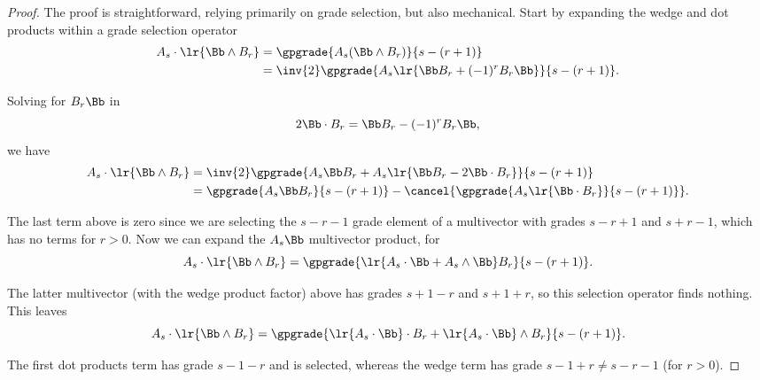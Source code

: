%
%
\begin{proof}
The proof is straightforward, relying primarily on grade selection, but also mechanical.
Start by expanding the wedge and dot products within a grade selection operator
\begin{equation}\label{eqn:wedgeDistributionIdentityProblemsWedgeDistributionIdentityProof:1460}
\begin{aligned}
A_s \cdot \lr{ \Bb \wedge B_r }
&= \gpgrade{A_s (\Bb \wedge B_r)}{s - (r + 1)} \\
&= \inv{2} \gpgrade{A_s \lr{\Bb B_r + (-1)^{r} B_r \Bb} }{s - (r + 1)}.
\end{aligned}
\end{equation}

Solving for \(B_r \Bb\) in
\begin{equation}\label{eqn:wedgeDistributionIdentityProblemsWedgeDistributionIdentityProof:1480}
2 \Bb \cdot B_r = \Bb B_r - (-1)^{r} B_r \Bb,
\end{equation}
we have
\begin{equation}\label{eqn:wedgeDistributionIdentityProblemsWedgeDistributionIdentityProof:1500}
\begin{aligned}
A_s \cdot \lr{ \Bb \wedge B_r }
&= \inv{2} \gpgrade{ A_s \Bb B_r + A_s \lr{ \Bb B_r - 2 \Bb \cdot B_r } }{s - (r + 1)} \\
&= \gpgrade{ A_s \Bb B_r }{s - (r + 1)}
-
\cancel{\gpgrade{ A_s \lr{ \Bb \cdot B_r } }{s - (r + 1)}}.
\end{aligned}
\end{equation}

The last term above is zero since we are selecting the \(s - r - 1\) grade element of a multivector with grades \(s - r + 1\) and \(s + r - 1\), which has no terms for \(r > 0\).
Now we can expand the \(A_s \Bb\) multivector product, for
\begin{equation}\label{eqn:wedgeDistributionIdentityProblemsWedgeDistributionIdentityProof:1520}
A_s \cdot \lr{ \Bb \wedge B_r }
=
\gpgrade{ \lr{ A_s \cdot \Bb + A_s \wedge \Bb} B_r }{s - (r + 1)}.
\end{equation}

The latter multivector (with the wedge product factor) above has grades \(s + 1 - r\) and \(s + 1 + r\), so this selection operator finds nothing.
This leaves
\begin{equation}\label{eqn:wedgeDistributionIdentityProblemsWedgeDistributionIdentityProof:1540}
A_s \cdot \lr{ \Bb \wedge B_r }
=
\gpgrade{
\lr{ A_s \cdot \Bb } \cdot B_r
+ \lr{ A_s \cdot \Bb } \wedge B_r
}{s - (r + 1)}.
\end{equation}

The first dot products term has grade \(s - 1 - r\) and is selected, whereas the wedge term has grade \(s - 1 + r \ne s - r - 1\) (for \(r > 0\)).
\end{proof}
